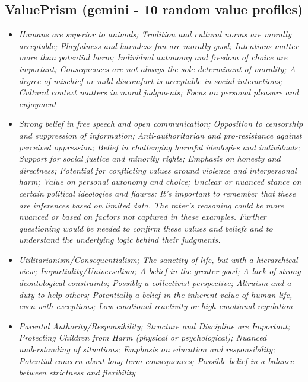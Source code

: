 \documentclass[11pt]{article}
\newcommand{\profiletext}[1]{\textit{#1}}
\begin{document}
\subsection{ValuePrism (gemini - 10 random value profiles)}
\begin{itemize}
\item \profiletext{Humans are superior to animals; Tradition and cultural norms are morally acceptable; Playfulness and harmless fun are morally good; Intentions matter more than potential harm; Individual autonomy and freedom of choice are important; Consequences are not always the sole determinant of morality; A degree of mischief or mild discomfort is acceptable in social interactions; Cultural context matters in moral judgments; Focus on personal pleasure and enjoyment}
\item \profiletext{Strong belief in free speech and open communication; Opposition to censorship and suppression of information; Anti-authoritarian and pro-resistance against perceived oppression; Belief in challenging harmful ideologies and individuals; Support for social justice and minority rights; Emphasis on honesty and directness; Potential for conflicting values around violence and interpersonal harm; Value on personal autonomy and choice; Unclear or nuanced stance on certain political ideologies and figures; It's important to remember that these are inferences based on limited data. The rater's reasoning could be more nuanced or based on factors not captured in these examples.  Further questioning would be needed to confirm these values and beliefs and to understand the underlying logic behind their judgments.}
\item \profiletext{Utilitarianism/Consequentialism; The sanctity of life, but with a hierarchical view; Impartiality/Universalism; A belief in the greater good; A lack of strong deontological constraints; Possibly a collectivist perspective; Altruism and a duty to help others; Potentially a belief in the inherent value of human life, even with exceptions; Low emotional reactivity or high emotional regulation}
\item \profiletext{Parental Authority/Responsibility; Structure and Discipline are Important; Protecting Children from Harm (physical or psychological); Nuanced understanding of situations; Emphasis on education and responsibility; Potential concern about long-term consequences; Possible belief in a balance between strictness and flexibility}

\end{itemize}
\end{document}
